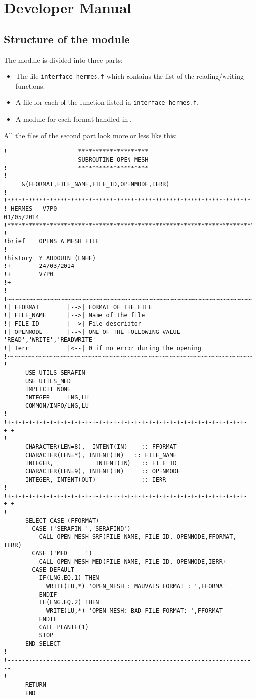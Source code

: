 \section{Developer Manual}
%

%
\subsection{Structure of the module}
%
The module is divided into three parts:
\begin{itemize}
\item The file \verb!interface_hermes.f! which contains the list of the
reading/writing functions.
\item A file for each of the function listed in \verb!interface_hermes.f!.
\item A module for each format handled in \telemacsystem.
\end{itemize}
%
All the files of the second part look more or less like this:
\begin{lstlisting}
!                    ********************
                     SUBROUTINE OPEN_MESH
!                    ********************
!
     &(FFORMAT,FILE_NAME,FILE_ID,OPENMODE,IERR)
!
!***********************************************************************
! HERMES   V7P0                                               01/05/2014
!***********************************************************************
!
!brief    OPENS A MESH FILE
!
!history  Y AUDOUIN (LNHE)
!+        24/03/2014
!+        V7P0
!+
!
!~~~~~~~~~~~~~~~~~~~~~~~~~~~~~~~~~~~~~~~~~~~~~~~~~~~~~~~~~~~~~~~~~~~~~~~
!| FFORMAT        |-->| FORMAT OF THE FILE
!| FILE_NAME      |-->| Name of the file
!| FILE_ID        |-->| File descriptor
!| OPENMODE       |-->| ONE OF THE FOLLOWING VALUE 'READ','WRITE','READWRITE'
!| Ierr           |<--| 0 if no error during the opening
!~~~~~~~~~~~~~~~~~~~~~~~~~~~~~~~~~~~~~~~~~~~~~~~~~~~~~~~~~~~~~~~~~~~~~~~
!
      USE UTILS_SERAFIN
      USE UTILS_MED
      IMPLICIT NONE
      INTEGER     LNG,LU
      COMMON/INFO/LNG,LU
!
!+-+-+-+-+-+-+-+-+-+-+-+-+-+-+-+-+-+-+-+-+-+-+-+-+-+-+-+-+-+-+-+-+-+-+-+
!
      CHARACTER(LEN=8),  INTENT(IN)    :: FFORMAT
      CHARACTER(LEN=*), INTENT(IN)   :: FILE_NAME
      INTEGER,            INTENT(IN)   :: FILE_ID
      CHARACTER(LEN=9), INTENT(IN)     :: OPENMODE
      INTEGER, INTENT(OUT)             :: IERR
!
!+-+-+-+-+-+-+-+-+-+-+-+-+-+-+-+-+-+-+-+-+-+-+-+-+-+-+-+-+-+-+-+-+-+-+-+
!
      SELECT CASE (FFORMAT)
        CASE ('SERAFIN ','SERAFIND')
          CALL OPEN_MESH_SRF(FILE_NAME, FILE_ID, OPENMODE,FFORMAT, IERR)
        CASE ('MED     ')
          CALL OPEN_MESH_MED(FILE_NAME, FILE_ID, OPENMODE,IERR)
        CASE DEFAULT
          IF(LNG.EQ.1) THEN
            WRITE(LU,*) 'OPEN_MESH : MAUVAIS FORMAT : ',FFORMAT
          ENDIF
          IF(LNG.EQ.2) THEN
            WRITE(LU,*) 'OPEN_MESH: BAD FILE FORMAT: ',FFORMAT
          ENDIF
          CALL PLANTE(1)
          STOP
      END SELECT
!
!-----------------------------------------------------------------------
!
      RETURN
      END
\end{lstlisting}
